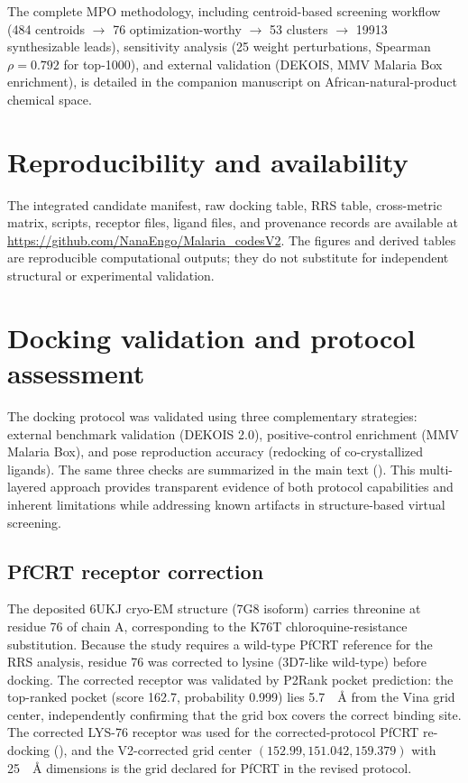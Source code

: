 \documentclass[journal=jcisd8,manuscript=suppinfo]{achemso}
\begin{document}
The complete MPO methodology, including centroid-based screening workflow (\num{484} centroids $\rightarrow$ \num{76} optimization-worthy $\rightarrow$ \num{53} clusters $\rightarrow$ \num{19913} synthesizable leads), sensitivity analysis (\num{25} weight perturbations, Spearman $\rho = \num{0.792}$ for top-1000), and external validation (DEKOIS, MMV Malaria Box enrichment), is detailed in the companion manuscript on African-natural-product chemical space.

\section{Reproducibility and availability}\label{sec:sm_repro}
The integrated candidate manifest, raw docking table, RRS table, cross-metric matrix, scripts, receptor files, ligand files, and provenance records are available at \url{https://github.com/NanaEngo/Malaria_codesV2}. The figures and derived tables are reproducible computational outputs; they do not substitute for independent structural or experimental validation.

\section{Docking validation and protocol assessment}\label{sec:sm_validation}
The docking protocol was validated using three complementary strategies: external benchmark validation (DEKOIS 2.0), positive-control enrichment (MMV Malaria Box), and pose reproduction accuracy (redocking of co-crystallized ligands). The same three checks are summarized in the main text (). This multi-layered approach provides transparent evidence of both protocol capabilities and inherent limitations while addressing known artifacts in structure-based virtual screening.

\subsection{PfCRT receptor correction}\label{sec:sm_val_crt}
The deposited 6UKJ cryo-EM structure (7G8 isoform) carries threonine at residue 76 of chain A, corresponding to the K76T chloroquine-resistance substitution. Because the study requires a wild-type PfCRT reference for the RRS analysis, residue 76 was corrected to lysine (3D7-like wild-type) before docking. The corrected receptor was validated by P2Rank pocket prediction: the top-ranked pocket (score 162.7, probability 0.999) lies 5.7~\SI{}{\angstrom} from the Vina grid center, independently confirming that the grid box covers the correct binding site. The corrected LYS-76 receptor was used for the corrected-protocol PfCRT re-docking (), and the V2-corrected grid center $(\num{152.99}, \num{151.042}, \num{159.379})$ with 25~\SI{}{\angstrom} dimensions is the grid declared for PfCRT in the revised protocol.
\end{document}
